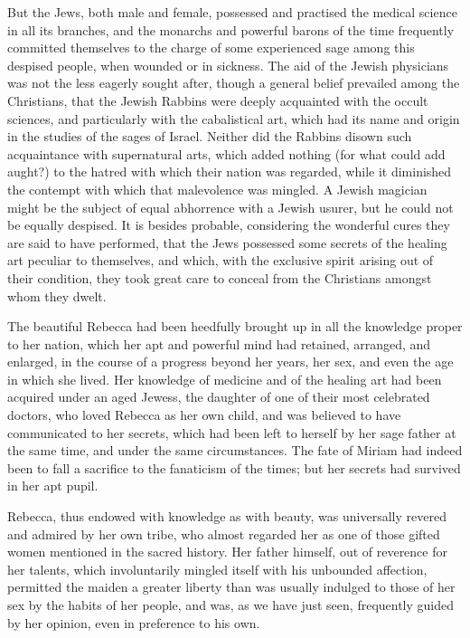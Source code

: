 But the Jews, both male and female, possessed and practised the medical
science in all its branches, and the monarchs and powerful barons of the
time frequently committed themselves to the charge of some experienced
sage among this despised people, when wounded or in sickness. The aid of
the Jewish physicians was not the less eagerly sought after, though a
general belief prevailed among the Christians, that the Jewish Rabbins
were deeply acquainted with the occult sciences, and particularly with
the cabalistical art, which had its name and origin in the studies of
the sages of Israel. Neither did the Rabbins disown such acquaintance
with supernatural arts, which added nothing (for what could add aught?)
to the hatred with which their nation was regarded, while it diminished
the contempt with which that malevolence was mingled. A Jewish magician
might be the subject of equal abhorrence with a Jewish usurer, but he
could not be equally despised. It is besides probable, considering the
wonderful cures they are said to have performed, that the Jews possessed
some secrets of the healing art peculiar to themselves, and which, with
the exclusive spirit arising out of their condition, they took great
care to conceal from the Christians amongst whom they dwelt.

The beautiful Rebecca had been heedfully brought up in all the knowledge
proper to her nation, which her apt and powerful mind had retained,
arranged, and enlarged, in the course of a progress beyond her years,
her sex, and even the age in which she lived. Her knowledge of medicine
and of the healing art had been acquired under an aged Jewess, the
daughter of one of their most celebrated doctors, who loved Rebecca as
her own child, and was believed to have communicated to her secrets,
which had been left to herself by her sage father at the same time, and
under the same circumstances. The fate of Miriam had indeed been to fall
a sacrifice to the fanaticism of the times; but her secrets had survived
in her apt pupil.

Rebecca, thus endowed with knowledge as with beauty, was universally
revered and admired by her own tribe, who almost regarded her as one of
those gifted women mentioned in the sacred history. Her father himself,
out of reverence for her talents, which involuntarily mingled itself
with his unbounded affection, permitted the maiden a greater liberty
than was usually indulged to those of her sex by the habits of her
people, and was, as we have just seen, frequently guided by her opinion,
even in preference to his own.


